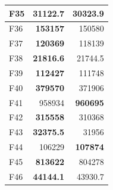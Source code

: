 \begin{table}[]
\begin{tabular}{lrr|}
\multicolumn{1}{|l|}{\cellcolor[HTML]{FCE6AB}F35} & \multicolumn{1}{r|}{\cellcolor[HTML]{D3FFB6}\textbf{31122.7}} & 30323.9                                                   \\ \hline
\multicolumn{1}{|l|}{\cellcolor[HTML]{FCE6AB}F36} & \multicolumn{1}{r|}{\cellcolor[HTML]{D3FFB6}\textbf{153157}}  & 150580                                                    \\ \hline
\multicolumn{1}{|l|}{\cellcolor[HTML]{FCE6AB}F37} & \multicolumn{1}{r|}{\cellcolor[HTML]{D3FFB6}\textbf{120369}}  & 118139                                                    \\ \hline
\multicolumn{1}{|l|}{\cellcolor[HTML]{FCE6AB}F38} & \multicolumn{1}{r|}{\cellcolor[HTML]{D3FFB6}\textbf{21816.6}} & 21744.5                                                   \\ \hline
\multicolumn{1}{|l|}{\cellcolor[HTML]{FCE6AB}F39} & \multicolumn{1}{r|}{\cellcolor[HTML]{D3FFB6}\textbf{112427}}  & 111748                                                    \\ \hline
\multicolumn{1}{|l|}{\cellcolor[HTML]{FCE6AB}F40} & \multicolumn{1}{r|}{\cellcolor[HTML]{D3FFB6}\textbf{379570}}  & 371906                                                    \\ \hline
\multicolumn{1}{|l|}{\cellcolor[HTML]{FCE6AB}F41} & \multicolumn{1}{r|}{958934}                                   & \cellcolor[HTML]{D3FFB6}\textbf{960695}                   \\ \hline
\multicolumn{1}{|l|}{\cellcolor[HTML]{FCE6AB}F42} & \multicolumn{1}{r|}{\cellcolor[HTML]{D3FFB6}\textbf{315558}}  & 310368                                                    \\ \hline
\multicolumn{1}{|l|}{\cellcolor[HTML]{FCE6AB}F43} & \multicolumn{1}{r|}{\cellcolor[HTML]{D3FFB6}\textbf{32375.5}} & 31956                                                     \\ \hline
\multicolumn{1}{|l|}{\cellcolor[HTML]{FCE6AB}F44} & \multicolumn{1}{r|}{106229}                                   & \cellcolor[HTML]{D3FFB6}\textbf{107874}                   \\ \hline
\multicolumn{1}{|l|}{\cellcolor[HTML]{FCE6AB}F45} & \multicolumn{1}{r|}{\cellcolor[HTML]{D3FFB6}\textbf{813622}}  & 804278                                                    \\ \hline
\multicolumn{1}{|l|}{\cellcolor[HTML]{FCE6AB}F46} & \multicolumn{1}{r|}{\cellcolor[HTML]{D3FFB6}\textbf{44144.1}} & 43930.7                                                   \\ \hline

\end{tabular}
\end{table}
